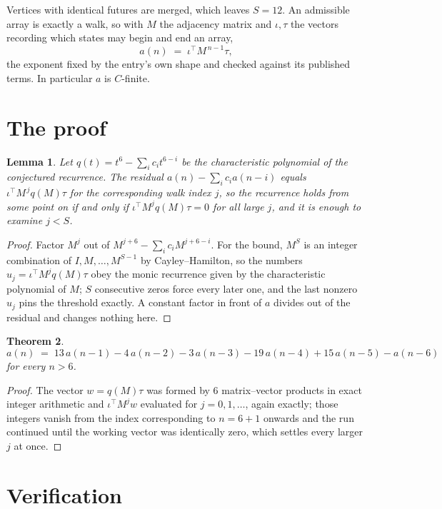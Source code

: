 \documentclass[11pt,a4paper]{article}
\theoremstyle{plain}
\newtheorem{theorem}{Theorem}
\newtheorem{lemma}[theorem]{Lemma}
\theoremstyle{definition}
\begin{document}
Vertices with identical futures are merged, which leaves $S=12$. An admissible array is exactly a walk, so with $M$ the adjacency matrix and $\iota,\tau$ the vectors recording which states may begin and end an array,
\[
a(n)\;=\;\iota^{\!\top}M^{\,n-1}\tau ,
\]
the exponent fixed by the entry's own shape and checked against its published terms. In
particular $a$ is $C$-finite.

\section{The proof}

\begin{lemma}\label{lem:crit}
Let $q(t)=t^{6}-\sum_i c_it^{6-i}$ be the characteristic polynomial of the
conjectured recurrence. The residual $a(n)-\sum_ic_ia(n-i)$ equals
$\iota^{\!\top}M^{\,j}q(M)\tau$ for the corresponding walk index $j$, so the recurrence
holds from some point on if and only if $\iota^{\!\top}M^{j}q(M)\tau=0$ for all large $j$,
and it is enough to examine $j<S$.
\end{lemma}

\begin{proof}
Factor $M^{j}$ out of $M^{j+6}-\sum_ic_iM^{j+6-i}$. For the bound, $M^{S}$
is an integer combination of $I,M,\dots,M^{S-1}$ by Cayley--Hamilton, so the numbers
$u_j=\iota^{\!\top}M^{j}q(M)\tau$ obey the monic recurrence given by the characteristic
polynomial of $M$; $S$ consecutive zeros force every later one, and the last nonzero $u_j$
pins the threshold exactly. A constant factor in front of $a$ divides out of the residual and
changes nothing here.
\end{proof}

\begin{theorem}
\[
a(n)\;=\;13\,a(n-1) - 4\,a(n-2) - 3\,a(n-3) - 19\,a(n-4) + 15\,a(n-5) - a(n-6)
\]
for every $n>6$.
\end{theorem}

\begin{proof}
The vector $w=q(M)\tau$ was formed by $6$ matrix--vector products in exact integer
arithmetic and $\iota^{\!\top}M^{j}w$ evaluated for $j=0,1,\dots$, again exactly; those
integers vanish from the index corresponding to $n=6+1$ onwards and the run continued
until the working vector was identically zero, which settles every larger $j$ at once.
\end{proof}

\section{Verification}
\end{document}
